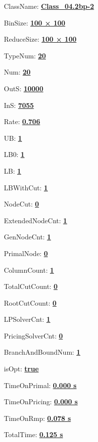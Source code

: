 \documentclass[11pt]{article}
\begin{document}
\pagestyle{empty}


ClassName: \underline{\textbf{Class_04.2bp-2}}
\par
BinSize: \underline{\textbf{100 × 100}}
\par
ReduceSize: \underline{\textbf{100 × 100}}
\par
TypeNum: \underline{\textbf{20}}
\par
Num: \underline{\textbf{20}}
\par
OutS: \underline{\textbf{10000}}
\par
InS: \underline{\textbf{7055}}
\par
Rate: \underline{\textbf{0.706}}
\par
UB: \underline{\textbf{1}}
\par
LB0: \underline{\textbf{1}}
\par
LB: \underline{\textbf{1}}
\par
LBWithCut: \underline{\textbf{1}}
\par
NodeCut: \underline{\textbf{0}}
\par
ExtendedNodeCnt: \underline{\textbf{1}}
\par
GenNodeCnt: \underline{\textbf{1}}
\par
PrimalNode: \underline{\textbf{0}}
\par
ColumnCount: \underline{\textbf{1}}
\par
TotalCutCount: \underline{\textbf{0}}
\par
RootCutCount: \underline{\textbf{0}}
\par
LPSolverCnt: \underline{\textbf{1}}
\par
PricingSolverCnt: \underline{\textbf{0}}
\par
BranchAndBoundNum: \underline{\textbf{1}}
\par
isOpt: \underline{\textbf{true}}
\par
TimeOnPrimal: \underline{\textbf{0.000 s}}
\par
TimeOnPricing: \underline{\textbf{0.000 s}}
\par
TimeOnRmp: \underline{\textbf{0.078 s}}
\par
TotalTime: \underline{\textbf{0.125 s}}
\par
\newpage
\end{document}
